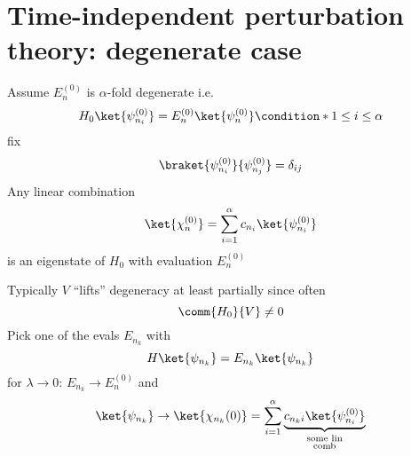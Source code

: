 \section{Time-independent perturbation theory: degenerate case}
Assume $E_{n}^{(0)}$ is $\alpha$-fold degenerate i.e. 
\begin{dmath}[]
	H_0\ket{\psi_{n_i}^{(0)}}=E_{n}^{(0)}\ket{\psi_{n}^{(0)}}\condition*{1\leq i \leq \alpha}
\end{dmath}
fix
\begin{dmath}[]
	\braket{\psi_{n_i}^{(0)}}{\psi_{n_j}^{(0)}}=\delta_{ij}
\end{dmath}
Any linear combination
\begin{dmath}[]
	\ket{\chi_{n}^{(0)}}=\sum_{i=1}^{\alpha}c_{n_i}\ket{\psi_{n_i}^{(0)}}
\end{dmath}
is an eigenstate of $H_0$ with evaluation $E_{n}^{(0)}$
\begin{figure}[]
	\begin{center}
	\end{center}
	\caption{}
	\label{fig:}
\end{figure}
Typically $V$ ``lifts'' degeneracy at least partially since often 
\begin{dmath}[]
	\comm{H_0}{V}\neq 0
\end{dmath}
Pick one of the evals $E_{n_k}$ with 
\begin{dmath}[]
	H\ket{\psi_{n_k}}=E_{n_k}\ket{\psi_{n_k}}
\end{dmath}
for $\lambda\to 0$: $E_{n_k}\to E_{n}^{(0)}$ and 
\begin{dmath}[]
	\ket{\psi_{n_k}}\to \ket{\chi_{n_k}(0)}=\sum_{i=1}^{\alpha}\underbrace{c_{n_k i}\ket{\psi_{n_i}^{(0)}}}_{\substack{\text{some lin}\\\text{comb}}}
\end{dmath}
